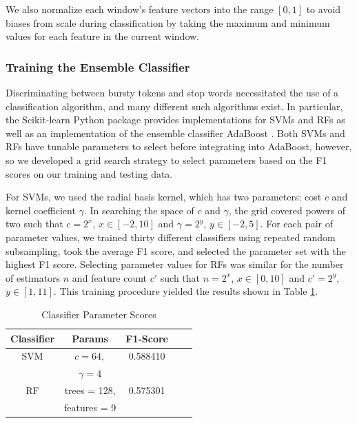 \documentclass{acm_proc_article-sp}
\begin{document}
We also normalize each window's feature vectors into the range $[0, 1]$ to avoid biases from scale during classification by taking the maximum and minimum values for each feature in the current window.

\subsubsection{Training the Ensemble Classifier}

Discriminating between bursty tokens and stop words necessitated the use of a classification algorithm, and many different such algorithms exist.
In particular, the Scikit-learn Python package provides implementations for SVMs and RFs as well as an implementation of the ensemble classifier AdaBoost \cite{scikit-learn}.
Both SVMs and RFs have tunable parameters to select before integrating into AdaBoost, however, so we developed a grid search strategy to select parameters based on the F1 scores on our training and testing data.

For SVMs, we used the radial basis kernel, which has two parameters: cost $c$ and kernel coefficient $\gamma$.
In searching the space of $c$ and $\gamma$, the grid covered powers of two such that $c = 2^x$, $x \in [-2, 10]$ and $\gamma = 2^y$, $y \in [-2, 5]$.
For each pair of parameter values, we trained thirty different classifiers using repeated random subsampling, took the average F1 score, and selected the parameter set with the highest F1 score.
Selecting parameter values for RFs was similar for the number of estimators $n$ and feature count $c'$ such that $n = 2^x$, $x \in [0, 10]$ and $c' = 2^y$, $y \in [1, 11]$.
This training procedure yielded the results shown in Table \ref{tab:scores}.

\begin{table}[htdp]
\caption{Classifier Parameter Scores}
\begin{center}
\begin{tabular}{|c|c|c|c|c|}
\hline
\textbf{Classifier} & \textbf{Params} & \textbf{F1-Score} \\ \hline
SVM & $c=64,$ & 0.588410 \\ 
& $\gamma=4$ & \\ \hline
RF & trees = 128, & 0.575301 \\
& features = 9 &  \\ \hline
\end{tabular}
\end{center}
\label{tab:scores}
\end{table}
\end{document}
